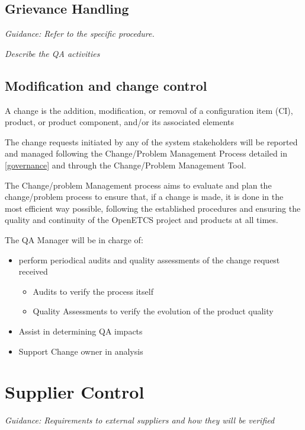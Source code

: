 \documentclass{template/openetcs_article}
\begin{document}
\subsection{Grievance Handling}
\textit{Guidance: Refer to the specific procedure. }

\textit{Describe the QA activities}

\subsection{Modification and change control }

A change is the addition, modification, or removal of a configuration item (CI), product, or product component, and/or its associated elements

The change requests initiated by any of the system stakeholders will be reported and managed following the Change/Problem Management Process  \citep{emp} detailed in \href{https://github.com/openETCS/governance/tree/master/Change-Problem%20Process}{[governance]} and through the Change/Problem Management Tool.

The Change/problem Management process aims to evaluate and plan the change/problem process to ensure that, if a change is made, it is done in the most efficient way possible, following the established procedures and ensuring the quality and continuity of the OpenETCS project and products at all times.

The QA Manager will be in charge of:
\begin{itemize}
\item perform periodical audits and quality assessments of the change request received
\begin{itemize}
\item Audits to verify the process itself
\item Quality Assessments to verify the evolution of the product quality
\end{itemize}
\item Assist in determining QA impacts
\item Support Change owner in analysis
\end{itemize}


\section{Supplier Control}
\textit{Guidance: Requirements to external suppliers and how they will be verified}

\end{document}
